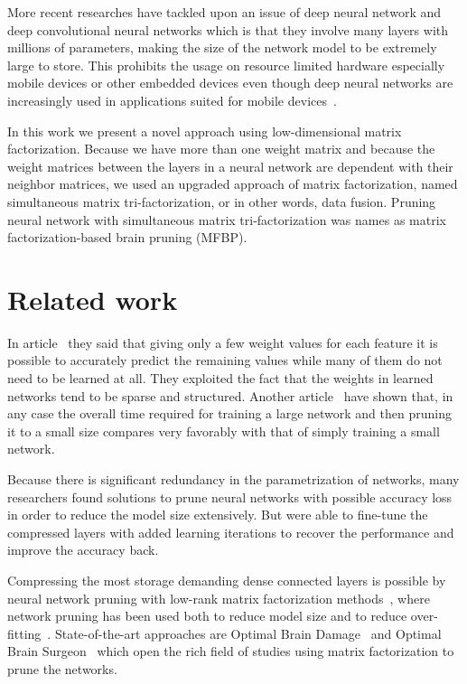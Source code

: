 \documentclass{article} %
\begin{document}
More recent researches have tackled upon an issue of deep neural network and
deep convolutional neural networks which is that they involve many layers with
millions of parameters, making the size of the network model to be extremely
large to store. This prohibits the usage on resource limited hardware
especially mobile devices or other embedded devices even though deep neural
networks are increasingly used in applications suited for mobile
devices~\cite{DBLP:journals/corr/GongLYB14}.

In this work we present a novel approach using low-dimensional matrix
factorization. Because we have more than one weight matrix and because the
weight matrices between the layers in a neural network are dependent with their
neighbor matrices, we used an upgraded approach of matrix factorization, named
simultaneous matrix tri-factorization, or in other words, data fusion. Pruning
neural network with simultaneous matrix tri-factorization was names as matrix
factorization-based brain pruning (MFBP).


\section{Related work}

In article~\cite{denil2013predicting} they said that giving only a few weight
values for each feature it is possible to accurately predict the remaining
values while many of them do not need to be learned at all. They exploited the
fact that the weights in learned networks tend to be sparse and structured.
Another article~\cite{augasta2013pruning} have shown that, in any case the
overall time required for training a large network and then pruning it to a
small size compares very favorably with that of simply training a small
network.

Because there is significant redundancy in the parametrization of networks,
many researchers found solutions to prune neural networks with possible
accuracy loss in order to reduce the model size extensively. But were able to
fine-tune the compressed layers with added learning iterations to recover the
performance and improve the accuracy back.

Compressing the most storage demanding dense connected layers is possible by
neural network pruning with low-rank matrix factorization
methods~\cite{bondarenko2014artificial, schmidhuber2015deep, sainath2013low},
where network pruning has been used both to reduce model size and to reduce
over-fitting~\cite{han2015learning}. State-of-the-art approaches are Optimal
Brain Damage~\cite{lecun1989optimal} and Optimal Brain
Surgeon~\cite{hassibi1993optimal} which open the rich field of studies using
matrix factorization to prune the networks.
\end{document}
